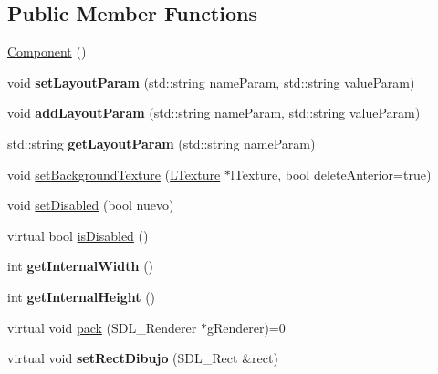 \subsection*{Public Member Functions}
\begin{DoxyCompactItemize}
\item 
\hyperlink{class_component_a8775db6d1a2c1afc2e77cd3c8f39da6f}{Component} ()
\item 
void {\bfseries set\+Layout\+Param} (std\+::string name\+Param, std\+::string value\+Param)\hypertarget{class_component_ae36d03537d53b88e2b4776250787f842}{}\label{class_component_ae36d03537d53b88e2b4776250787f842}

\item 
void {\bfseries add\+Layout\+Param} (std\+::string name\+Param, std\+::string value\+Param)\hypertarget{class_component_ae79cb654e6be297577f35c599d34254c}{}\label{class_component_ae79cb654e6be297577f35c599d34254c}

\item 
std\+::string {\bfseries get\+Layout\+Param} (std\+::string name\+Param)\hypertarget{class_component_a2c1f1bf9132f6784d46150b90fe89500}{}\label{class_component_a2c1f1bf9132f6784d46150b90fe89500}

\item 
void \hyperlink{class_component_a354add2c6de9a08357fbfece7fe50ac5}{set\+Background\+Texture} (\hyperlink{class_l_texture}{L\+Texture} $\ast$l\+Texture, bool delete\+Anterior=true)
\item 
void \hyperlink{class_component_a1440d7c2b2c4bfd8310931b54e8f4e61}{set\+Disabled} (bool nuevo)
\item 
virtual bool \hyperlink{class_component_aedd9acaa31b5c50a8cf233014b85c0cc}{is\+Disabled} ()
\item 
int {\bfseries get\+Internal\+Width} ()\hypertarget{class_component_a27900513de0e1cd920ffb0788f144bc9}{}\label{class_component_a27900513de0e1cd920ffb0788f144bc9}

\item 
int {\bfseries get\+Internal\+Height} ()\hypertarget{class_component_a74576e7c5591fe7adc74a18c9fa752e4}{}\label{class_component_a74576e7c5591fe7adc74a18c9fa752e4}

\item 
virtual void \hyperlink{class_component_aa471f2c3a24525f584ed19cf25222e70}{pack} (S\+D\+L\+\_\+\+Renderer $\ast$g\+Renderer)=0
\item 
virtual void {\bfseries set\+Rect\+Dibujo} (S\+D\+L\+\_\+\+Rect \&rect)\hypertarget{class_component_a06933061417ef2fec8588e731802c76b}{}\label{class_component_a06933061417ef2fec8588e731802c76b}


\end{DoxyCompactItemize}

